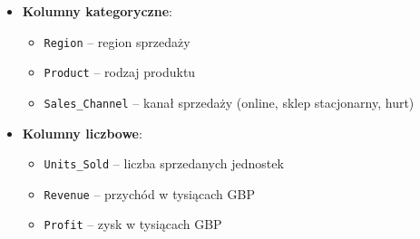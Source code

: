 \documentclass[
  polish,
  letterpaper,
  DIV=11,
  numbers=noendperiod]{scrreprt}
\providecommand{\tightlist}{%
  \setlength{\itemsep}{0pt}\setlength{\parskip}{0pt}}
\begin{document}
\begin{itemize}
\tightlist
\item
  \textbf{Kolumny kategoryczne}:

  \begin{itemize}
  \tightlist
  \item
    \texttt{Region} -- region sprzedaży
  \item
    \texttt{Product} -- rodzaj produktu
  \item
    \texttt{Sales\_Channel} -- kanał sprzedaży (online, sklep
    stacjonarny, hurt)
  \end{itemize}
\item
  \textbf{Kolumny liczbowe}:

  \begin{itemize}
  \tightlist
  \item
    \texttt{Units\_Sold} -- liczba sprzedanych jednostek
  \item
    \texttt{Revenue} -- przychód w tysiącach GBP
  \item
    \texttt{Profit} -- zysk w tysiącach GBP
  \end{itemize}
\end{itemize}
\end{document}

